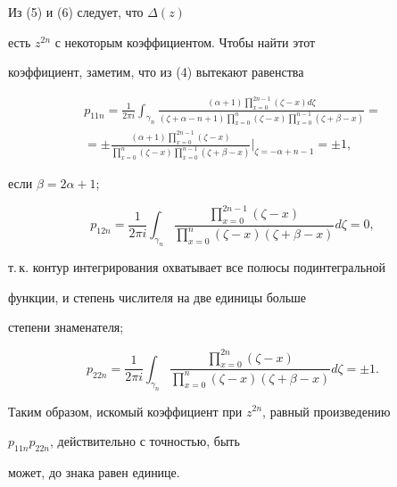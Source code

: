 \begin{pf} 


Из (5) и (6) следует, что $\Delta(z)$ 


есть $z^{2n}$ с некоторым коэффициентом. Чтобы найти этот 


коэффициент, заметим, что из (4) вытекают равенства 


\begin{multline*} 


p_{11n}=\frac{1}{2\pi i}\int_{\gamma_n} 


\frac{(\alpha+1)\prod\limits^{2n-1}_{x=0}(\zeta-x)d\zeta} 


{(\zeta+\alpha-n+1)\prod\limits^n_{x=0}(\zeta-x) 


\prod\limits^{n-1}_{x=0}(\zeta+\beta-x)} =\\ 


% 


=\pm\frac{(\alpha+1)\prod\limits^{2n-1}_{x=0}(\zeta-x)} 


{\prod\limits^n_{x=0}(\zeta-x)\prod\limits^{n-1}_{x=0} 


(\zeta+\beta-x)}\Bigg|_{\zeta=-\alpha+n-1}=\pm 1, 


\end{multline*} 


если $\beta=2\alpha+1$; 


$$ 


p_{12n}=\frac{1}{2\pi i}\int_{\gamma_n} 


\frac{\prod\limits^{2n-1}_{x=0}(\zeta-x)} 


{\prod\limits^n_{x=0}(\zeta-x)(\zeta+\beta-x)}d\zeta=0, 


$$ 


т.\,к. контур интегрирования охватывает все полюсы подинтегральной 


функции, и степень числителя на две единицы больше 


степени знаменателя; 


$$ 


p_{22n}=\frac{1}{2\pi i}\int_{\gamma_n} 


\frac{\prod\limits^{2n}_{x=0}(\zeta-x)} 


{\prod\limits^n_{x=0}(\zeta-x)(\zeta+\beta-x)}d\zeta=\pm1. 


$$ 


Таким образом, искомый коэффициент при $z^{2n}$, равный произведению 


$p_{11n}p_{22n}$, действительно с точностью, быть 


может, до знака равен единице. 


\end{pf} 


